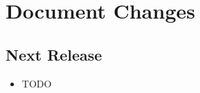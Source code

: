 \section*{Document Changes}

\subsection*{Next Release} %
\begin{itemize}
\item TODO
\end{itemize}

